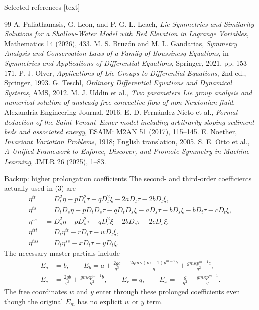 \documentclass[aspectratio=169,11pt]{beamer}
\begin{document}
\begin{frame}{Selected references}
\scriptsize
{}[text]
\begin{thebibliography}{99}
\setlength{\itemsep}{1pt}
 A. Paliathanasis, G. Leon, and P. G. L. Leach,
\emph{Lie Symmetries and Similarity Solutions for a Shallow-Water Model with Bed Elevation in Lagrange Variables},
Mathematics 14 (2026), 433.
 M. S. Bruz\'on and M. L. Gandarias,
\emph{Symmetry Analysis and Conservation Laws of a Family of Boussinesq Equations},
in \emph{Symmetries and Applications of Differential Equations}, Springer, 2021, pp. 153--171.
 P. J. Olver, \emph{Applications of Lie Groups to Differential Equations}, 2nd ed., Springer, 1993.
 G. Teschl, \emph{Ordinary Differential Equations and Dynamical Systems}, AMS, 2012.
 M. J. Uddin et al., \emph{Two parameters Lie group analysis and numerical solution of unsteady free convective flow of non-Newtonian fluid}, Alexandria Engineering Journal, 2016.
 E. D. Fern\'andez-Nieto et al., \emph{Formal deduction of the Saint-Venant--Exner model including arbitrarily sloping sediment beds and associated energy}, ESAIM: M2AN 51 (2017), 115--145.
 E. Noether, \emph{Invariant Variation Problems}, 1918; English translation, 2005.
 S. E. Otto et al., \emph{A Unified Framework to Enforce, Discover, and Promote Symmetry in Machine Learning}, JMLR 26 (2025), 1--83.
\end{thebibliography}
\end{frame}
\begin{frame}{Backup: higher prolongation coefficients}
\scriptsize
The second- and third-order coefficients actually used in (3) are
\begin{align*}
\eta^{tt}&=D_t^2\eta-pD_t^2\tau-qD_t^2\xi-2aD_t\tau-2bD_t\xi,\\
\eta^{ts}&=D_tD_s\eta-pD_tD_s\tau-qD_tD_s\xi
-aD_s\tau-bD_s\xi-bD_t\tau-cD_t\xi,\\
\eta^{ss}&=D_s^2\eta-pD_s^2\tau-qD_s^2\xi-2bD_s\tau-2cD_s\xi,\\
\eta^{ttt}&=D_t\eta^{tt}-rD_t\tau-wD_t\xi,\\
\eta^{tss}&=D_t\eta^{ss}-xD_t\tau-yD_t\xi.
\end{align*}
The necessary master partials include
\begin{align*}
E_a&=b,\qquad
E_b=a+\frac{2gc}{q^3}-\frac{2gm\kappa(m-1)p^{m-2}b}{q}
+\frac{gm\kappa p^{m-1}c}{q^2},\\
E_c&=\frac{2gb}{q^3}+\frac{gm\kappa p^{m-1}b}{q^2},\qquad
E_r=q,\qquad E_x=-\frac g{q^2}-\frac{gm\kappa p^{m-1}}q.
\end{align*}
The free coordinates $w$ and $y$ enter through these prolonged coefficients
even though the original $E_m$ has no explicit $w$ or $y$ term.
\end{frame}
\end{document}
